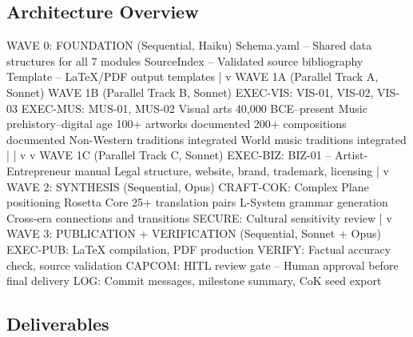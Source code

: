 \documentclass[11pt,letterpaper]{article}
\begin{document}
\subsection{Architecture Overview}

\begin{asciibox}
WAVE 0: FOUNDATION (Sequential, Haiku)
  Schema.yaml -- Shared data structures for all 7 modules
  SourceIndex  -- Validated source bibliography
  Template     -- LaTeX/PDF output templates
         |
         v
WAVE 1A (Parallel Track A, Sonnet)     WAVE 1B (Parallel Track B, Sonnet)
  EXEC-VIS: VIS-01, VIS-02, VIS-03       EXEC-MUS: MUS-01, MUS-02
  Visual arts 40,000 BCE--present         Music prehistory--digital age
  100+ artworks documented                200+ compositions documented
  Non-Western traditions integrated       World music traditions integrated
         |                                       |
         v                                       v
WAVE 1C (Parallel Track C, Sonnet)
  EXEC-BIZ: BIZ-01 -- Artist-Entrepreneur manual
  Legal structure, website, brand, trademark, licensing
         |
         v
WAVE 2: SYNTHESIS (Sequential, Opus)
  CRAFT-COK: Complex Plane positioning
  Rosetta Core 25+ translation pairs
  L-System grammar generation
  Cross-era connections and transitions
  SECURE: Cultural sensitivity review
         |
         v
WAVE 3: PUBLICATION + VERIFICATION (Sequential, Sonnet + Opus)
  EXEC-PUB: LaTeX compilation, PDF production
  VERIFY: Factual accuracy check, source validation
  CAPCOM: HITL review gate -- Human approval before final delivery
  LOG: Commit messages, milestone summary, CoK seed export
\end{asciibox}

\subsection{Deliverables}
\end{document}
